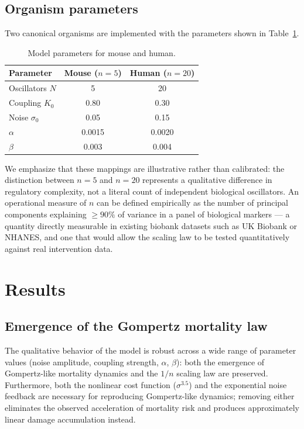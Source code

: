 \documentclass[12pt]{article}
\begin{document}
\subsection{Organism parameters}

Two canonical organisms are implemented with the parameters shown in
Table~\ref{tab:params}.

\begin{table}[h]
\centering
\caption{Model parameters for mouse and human.}
\label{tab:params}
\begin{tabular}{lcc}
\toprule
Parameter & Mouse ($n{=}5$) & Human ($n{=}20$) \\
\midrule
Oscillators $N$ & 5 & 20 \\
Coupling $K_0$ & 0.80 & 0.30 \\
Noise $\sigma_0$ & 0.05 & 0.15 \\
$\alpha$ & 0.0015 & 0.0020 \\
$\beta$ & 0.003 & 0.004 \\
\bottomrule
\end{tabular}
\end{table}

We emphasize that these mappings are illustrative rather than calibrated: the
distinction between $n{=}5$ and $n{=}20$ represents a qualitative difference in
regulatory complexity, not a literal count of independent biological oscillators.
An operational measure of $n$ can be defined empirically as the number of
principal components explaining $\geq\!90\%$ of variance in a panel of
biological markers — a quantity directly measurable in existing biobank datasets
such as UK Biobank or NHANES, and one that would allow the scaling law to be
tested quantitatively against real intervention data.

\section{Results}

\subsection{Emergence of the Gompertz mortality law}

The qualitative behavior of the model is robust across a wide range of parameter
values (noise amplitude, coupling strength, $\alpha$, $\beta$): both the
emergence of Gompertz-like mortality dynamics and the $1/n$ scaling law are
preserved. Furthermore, both the nonlinear cost function ($\sigma^{3.5}$) and
the exponential noise feedback are necessary for reproducing Gompertz-like
dynamics; removing either eliminates the observed acceleration of mortality risk
and produces approximately linear damage accumulation instead.
\end{document}

